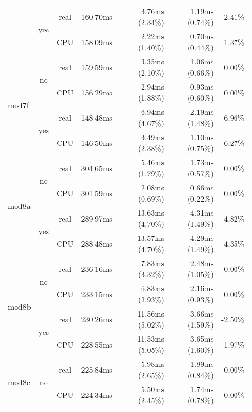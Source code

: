 \documentclass[en]{pracamgr}
\begin{document}
\begin{small}
\begin{longtable}{|l|c|c|r|r|r|r|}
                          \cline{2-7}
                          & \multirow{2}{*}{yes} & real & 160.70ms & 3.76ms (2.34\%) & 1.19ms (0.74\%) & 2.41\% \\*
                          &                      & CPU  & 158.09ms & 2.22ms (1.40\%) & 0.70ms (0.44\%) & 1.37\% \\
\hline
\multirow{4}{*}{mod7f}    & \multirow{2}{*}{no}  & real & 159.59ms & 3.35ms (2.10\%) & 1.06ms (0.66\%) & 0.00\% \\*
                          &                      & CPU  & 156.29ms & 2.94ms (1.88\%) & 0.93ms (0.60\%) & 0.00\% \\*
                          \cline{2-7}
                          & \multirow{2}{*}{yes} & real & 148.48ms & 6.94ms (4.67\%) & 2.19ms (1.48\%) & -6.96\% \\*
                          &                      & CPU  & 146.50ms & 3.49ms (2.38\%) & 1.10ms (0.75\%) & -6.27\% \\
\hline
\multirow{4}{*}{mod8a}    & \multirow{2}{*}{no}  & real & 304.65ms & 5.46ms (1.79\%) & 1.73ms (0.57\%) & 0.00\% \\*
                          &                      & CPU  & 301.59ms & 2.08ms (0.69\%) & 0.66ms (0.22\%) & 0.00\% \\*
                          \cline{2-7}
                          & \multirow{2}{*}{yes} & real & 289.97ms & 13.63ms (4.70\%) & 4.31ms (1.49\%) & -4.82\% \\*
                          &                      & CPU  & 288.48ms & 13.57ms (4.70\%) & 4.29ms (1.49\%) & -4.35\% \\
\hline
\multirow{4}{*}{mod8b}    & \multirow{2}{*}{no}  & real & 236.16ms & 7.83ms (3.32\%) & 2.48ms (1.05\%) & 0.00\% \\*
                          &                      & CPU  & 233.15ms & 6.83ms (2.93\%) & 2.16ms (0.93\%) & 0.00\% \\*
                          \cline{2-7}
                          & \multirow{2}{*}{yes} & real & 230.26ms & 11.56ms (5.02\%) & 3.66ms (1.59\%) & -2.50\% \\*
                          &                      & CPU  & 228.55ms & 11.53ms (5.05\%) & 3.65ms (1.60\%) & -1.97\% \\
\hline
\multirow{4}{*}{mod8c}    & \multirow{2}{*}{no}  & real & 225.84ms & 5.98ms (2.65\%) & 1.89ms (0.84\%) & 0.00\% \\*
                          &                      & CPU  & 224.34ms & 5.50ms (2.45\%) & 1.74ms (0.78\%) & 0.00\% \\*

\end{longtable}
\end{small}
\end{document}
